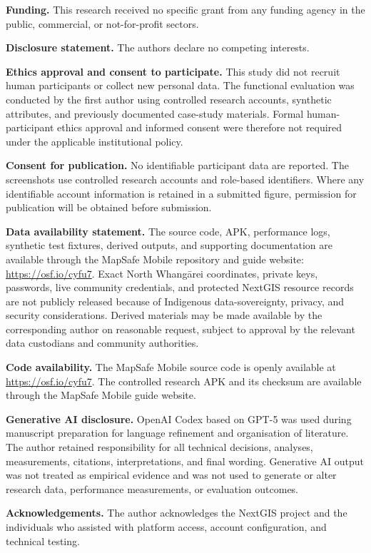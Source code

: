 \documentclass[]{interact}
\begin{document}
\noindent\textbf{Funding.}
This research received no specific grant from any funding agency in the
public, commercial, or not-for-profit sectors.

\medskip
\noindent\textbf{Disclosure statement.}
The authors declare no competing interests.

\medskip
\noindent\textbf{Ethics approval and consent to participate.}
This study did not recruit human participants or collect new personal data.
The functional evaluation was conducted by the first author using controlled
research accounts, synthetic attributes, and previously documented case-study
materials. Formal human-participant ethics approval and informed consent were
therefore not required under the applicable institutional policy.

\medskip
\noindent\textbf{Consent for publication.}
No identifiable participant data are reported. The screenshots use controlled
research accounts and role-based identifiers. Where any identifiable account
information is retained in a submitted figure, permission for publication will
be obtained before submission.

\medskip
\noindent\textbf{Data availability statement.}
The source code, APK, performance logs, synthetic test fixtures, derived
outputs, and supporting documentation are available through the MapSafe Mobile
repository and guide website:
\url{https://osf.io/cyfu7}. 
Exact North Whangārei coordinates, private keys, passwords, live community
credentials, and protected NextGIS resource records are not publicly released
because of Indigenous data-sovereignty, privacy, and security considerations.
Derived materials may be made available by the corresponding author on
reasonable request, subject to approval by the relevant data custodians and
community authorities.

\medskip
\noindent\textbf{Code availability.}
The MapSafe Mobile source code is openly available at
\url{https://osf.io/cyfu7}.
The controlled research APK and its checksum are available through the
MapSafe Mobile guide website.


\medskip
\noindent\textbf{Generative AI disclosure.}
OpenAI Codex based on GPT-5 was used during manuscript preparation for language
refinement and organisation of literature. The author retained responsibility for all
technical decisions, analyses, measurements, citations, interpretations, and
final wording. Generative AI output was not treated as empirical evidence and
was not used to generate or alter research data, performance measurements, or
evaluation outcomes.

\medskip
\noindent\textbf{Acknowledgements.}
The author acknowledges the NextGIS project and the individuals who assisted
with platform access, account configuration, and technical testing.

\clearpage

\end{document}
